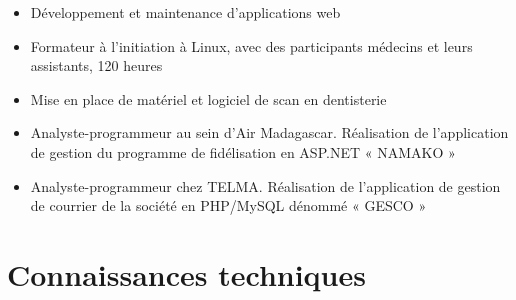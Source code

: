 \documentclass[a4paper,11pt]{moderncv}
\begin{document}
{}{}{}{
\begin{itemize}
	\item Développement et maintenance d’applications web
\end{itemize}
}

{}{}{}{
\begin{itemize}
	\item Formateur à l’initiation à Linux, avec des participants médecins et leurs assistants, 120 heures
	\item Mise en place de matériel et logiciel de scan en dentisterie
\end{itemize}
}

{}{}{}{
\begin{itemize}
	\item Analyste-programmeur au sein d’Air Madagascar. Réalisation de l'application de gestion du programme de fidélisation en ASP.NET « NAMAKO »
\end{itemize}
}

{}{}{}{
\begin{itemize}
	\item Analyste-programmeur chez TELMA. Réalisation de l'application de gestion de courrier
de la société en PHP/MySQL dénommé « GESCO »
\end{itemize}
}

\section{Connaissances techniques}



\end{document}
